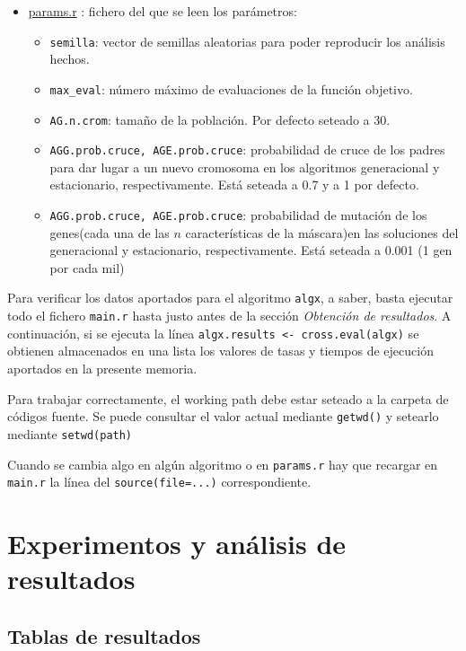 \documentclass[a4paper,11pt]{article}
\newcommand{\hrefr}[1]{
\href{../bin/#1}{#1}
}
\begin{document}
\begin{itemize}
 \item \hrefr{params.r}: fichero del que se leen los parámetros:
  \begin{itemize}
    \item \texttt{semilla}: vector de semillas aleatorias para poder reproducir los análisis hechos.
    \item \texttt{max\_eval}: número máximo de evaluaciones de la función objetivo.
    \item \texttt{AG.n.crom}: tamaño de la población. Por defecto seteado a 30.
    \item \texttt{AGG.prob.cruce, AGE.prob.cruce}: probabilidad de cruce de los padres para dar lugar a un nuevo cromosoma 
    en los algoritmos generacional y estacionario, respectivamente. Está seteada a 0.7 y a 1 por defecto.
    \item \texttt{AGG.prob.cruce, AGE.prob.cruce}: probabilidad de mutación de los genes(cada una de las $n$ características
    de la máscara)en las soluciones del generacional y estacionario, respectivamente. Está seteada a 0.001 (1 gen por cada mil)
  \end{itemize}
 \end{itemize}
 
 Para verificar los datos aportados para el algoritmo \texttt{algx}, a saber, basta ejecutar todo el fichero \texttt{main.r}
 hasta justo antes de la sección \textit{Obtención de resultados}. A continuación, si se ejecuta la línea 
 \texttt{algx.results <- cross.eval(algx)} se obtienen almacenados en una lista los valores de tasas y tiempos de ejecución
 aportados en la presente memoria. 
 
 Para trabajar correctamente, el working path debe estar seteado a la carpeta de códigos fuente. Se puede consultar el 
 valor actual mediante \texttt{getwd()} y setearlo mediante \texttt{setwd(path)}
 
 Cuando se cambia algo en algún algoritmo o en \texttt{params.r} hay que recargar en \texttt{main.r}
 la línea del \texttt{source(file=...)} correspondiente.
 
 \section{Experimentos y análisis de resultados}
 \subsection{Tablas de resultados}
  
\end{document}
